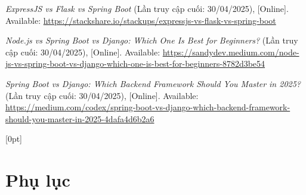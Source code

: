 \documentclass[12pt, a4paper]{article}
\begin{document}
\begin{thebibliography}{}
	 \textit{ExpressJS vs Flask vs Spring Boot} (Lần truy cập cuối: 30/04/2025), [Online]. Available: \url{https://stackshare.io/stackups/expressjs-vs-flask-vs-spring-boot}

	 \textit{Node.js vs Spring Boot vs Django: Which One Is Best for Beginners?} (Lần truy cập cuối: 30/04/2025), [Online]. Available: \url{https://sandydev.medium.com/node-js-vs-spring-boot-vs-django-which-one-is-best-for-beginners-8782d3be54}

	 \textit{Spring Boot vs Django: Which Backend Framework Should You Master in 2025?} (Lần truy cập cuối: 30/04/2025), [Online]. Available: \url{https://medium.com/codex/spring-boot-vs-django-which-backend-framework-should-you-master-in-2025-4dafa4d6b2a6}
\end{thebibliography}
\newpage
\appendix
\renewcommand{\thesection}{\arabic{section}} %
\titleformat{\section}{\normalfont\Large\bfseries}{\thesection}{1em}{} %
  [0pt]{\vspace{1ex}}{\bfseries \thecontentslabel \quad}{}
  {\hfill\bfseries\contentspage}

\section*{\centering \Large Phụ lục}

\end{document}
